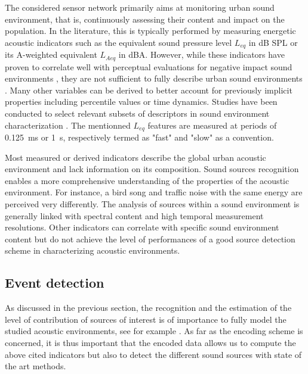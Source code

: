 \documentclass[sensors,article,submit,moreauthors,pdftex,10pt,a4paper]{mdpi}
\begin{document}
The considered sensor network primarily aims at monitoring urban sound environment, that is, continuously assessing their content and impact on the population. In the literature, this is typically performed by measuring energetic acoustic indicators such as the equivalent sound pressure level $L_{eq}$ in dB SPL or its A-weighted equivalent $L_{Aeq}$ in dBA. However, while these indicators have proven to correlate well with perceptual evaluations for negative impact sound environments \cite{gozalo2015}, they are not sufficient to fully describe urban sound environments \cite{rychtarikova2013}. Many other variables can be derived to better account for previously implicit properties \cite{can2016} including percentile values or time dynamics. Studies have been conducted to select relevant subsets of descriptors in sound environment characterization \cite{can2015, brocolini2013, nilsson2007}. The mentionned $L_{eq}$ features are measured at periods of 0.125~ms or 1~s, respectively termed as "fast" and "slow" as a convention.

Most measured or derived indicators describe the global urban acoustic environment and lack information on its composition. Sound sources recognition enables a more comprehensive understanding of the properties of the acoustic environment. For instance, a bird song and traffic noise with the same energy are perceived very differently. The analysis of sources within a sound environment is generally linked with spectral content \cite{ishiyama2000} and high temporal measurement resolutions. Other indicators can correlate with specific sound environment content \cite{aumond2017} but do not achieve the level of performances of a good source detection scheme in characterizing acoustic environments.



\subsection{Event detection}

As discussed in the previous section, the recognition and the estimation of the level of contribution of sources of interest is of importance to fully model the studied acoustic environments, see for example \cite{alsina2016design, app7020146, gloaguen2016estimating}. As far as the encoding scheme is concerned, it is thus important that the encoded data allows us to compute the above cited indicators but also to detect the different sound sources with state of the art methods.
\end{document}
